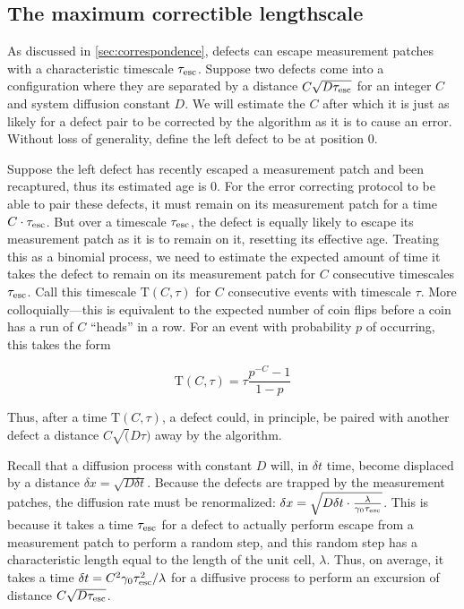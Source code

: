 \documentclass[twocolumn,superscriptaddress,aps,prb,floatfix]{revtex4-1}
\newcommand{\te}{\tau_{\rm{esc}}}
\newcommand{\Tau}{\mathrm{T}}
\begin{document}
\subsection{The maximum correctible lengthscale}

As discussed in \ref{sec:correspondence}, defects can escape measurement patches with a characteristic timescale $\te$.  Suppose two defects come into a configuration where they are separated by a distance $C \sqrt{D \te}$ for an integer $C$ and system diffusion constant $D$.  We will estimate the $C$ after which it is just as likely for a defect pair to be corrected by the algorithm as it is to cause an error.  Without loss of generality, define the left defect to be at position $0$.

Suppose the left defect has recently escaped a measurement patch and been recaptured, thus its estimated age is $0$.  For the error correcting protocol to be able to pair these defects, it must remain on its measurement patch for a time $C\cdot \te$.  But over a timescale $\te$, the defect is equally likely to escape its measurement patch as it is to remain on it, resetting its effective age.  Treating this as a binomial process, we need to estimate the expected amount of time it takes the defect to remain on its measurement patch for $C$ consecutive timescales $\te$.  Call this timescale $\Tau(C,\tau)$ for $C$ consecutive events with timescale $\tau$.  More colloquially---this is equivalent to the expected number of coin flips before a coin has a run of $C$ ``heads'' in a row.  For an event with probability $p$ of occurring, this takes the form

\begin{equation}
\Tau(C,\tau) = \tau \frac{p^{-C} - 1}{1 - p}
\end{equation}

Thus, after a time $\Tau(C,\tau)$, a defect could, in principle, be paired with another defect a distance $C \sqrt(D \tau)$ away by the algorithm.

Recall that a diffusion process with constant $D$ will, in $\delta t$ time, become displaced by a distance $\delta x = \sqrt{D \delta t}$.  Because the defects are trapped by the measurement patches, the diffusion rate must be renormalized: $\delta x = \sqrt{D \delta t \cdot \frac{\lambda}{\gamma_0 \te}}$.  This is because it takes a time $\te$ for a defect to actually perform escape from a measurement patch to perform a random step, and this random step has a characteristic length equal to the length of the unit cell, $\lambda$.  Thus, on average, it takes a time $\delta t = C^2 \gamma_0 \te^2 / \lambda$ for a diffusive process to perform an excursion of distance $C \sqrt{D \te}$.
\end{document}
